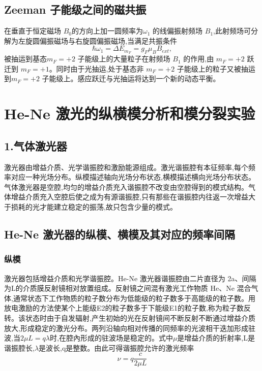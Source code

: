 \documentclass[12pt, a4paper]{article}
\begin{document}
\subsection{Zeeman 子能级之间的磁共振}
在垂直于恒定磁场 $B_0$的方向上加一圆频率为$\omega_1$ 的线偏振射频场 $B_1$,此射频场可分解为左旋圆偏振磁场与右旋圆偏振磁场,当满足共振条件
\begin{equation}
   \hbar\omega_1=\Delta E_{m_F} =g_F\mu_BB_{ext},
\end{equation}
被抽运到基态$m_F=+2$ 子能级上的大量粒子在射频场 $B_1$ 的作用,由 $m_F=+2$ 跃迁到 $m_F=+1$。同时由于光抽运,处于基态非 $m_F=+2$ 子能级上的粒子又被抽运到$m_F=+2$ 子能级上。感应跃迁与光抽运将达到一个新的动态平衡。

\section{He-Ne 激光的纵横模分析和模分裂实验}
\subsection{1.气体激光器}
激光器由增益介质、光学谐振腔和激励能源组成。激光谐振腔有本征频率,每个频率对应一种光场分布。纵模描述轴向光场分布状态,横模描述横向光场分布状态。
气体激光器是空腔,均匀的增益介质充入谐振腔不改变由空腔得到的模式结构。气体增益介质充入空腔后使之成为有源谐振腔,只有那些在谐振腔内往返一次增益大于损耗的光才能建立稳定的振荡,故只包含少量的模式。

\subsection{He-Ne 激光器的纵模、横模及其对应的频率间隔}

\subsubsection{纵模}
激光器包括增益介质和光学谐振腔。He-Ne 激光器谐振腔由二片直径为 2a、间隔为L的介质膜反射镜相对放置组成。反射镜之间混有激光工作物质 He、Ne 混合气体,通常状态下工作物质的粒子数分布为低能级的粒子数多于高能级的粒子数。用放电激励的方法使某个上能级E2的粒子数多于下能级E1的粒子数,称为粒子数反转。该状态时由于自发辐射,产生初始的光在反射镜间不断反射不断通过增益介质放大,形成稳定的激光分布。两列沿轴向相对传播的同频率的光波相干迭加形成驻波,当$2\mu L=q\lambda$时,在腔內形成的驻波场是稳定的。式中$\mu$是增益介质的折射率,L是谐振腔长,$\lambda$是波长,q是整数。由此可得谐振腔允许的激光频率
\begin{equation}
    \nu= q \frac{c}{2\mu L}
\end{equation}
\end{document}

